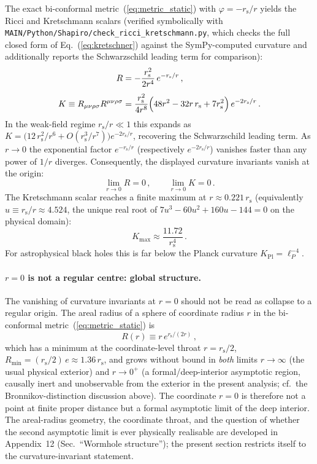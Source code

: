 \documentclass[aps,prd,onecolumn,superscriptaddress,nofootinbib,showpacs,12pt]{revtex4-2}
\newcommand{\rs}{r_{\mathrm{s}}}
\begin{document}
The exact bi-conformal metric~(\ref{eq:metric_static}) with
$\varphi = -\rs/r$ yields the Ricci and Kretschmann scalars
(verified symbolically with
\texttt{MAIN/Python/Shapiro/check\_ricci\_kretschmann.py}, which checks
the full closed form of Eq.~(\ref{eq:kretschner}) against
the SymPy-computed curvature and additionally reports the
Schwarzschild leading term for comparison):
\begin{align}
  R &= -\frac{\rs^{2}}{2r^{4}}\,e^{-\rs/r}\,,
  \label{eq:ricci}\\[4pt]
  K \equiv R_{\mu\nu\rho\sigma}R^{\mu\nu\rho\sigma}
    &= \frac{\rs^{2}}{4r^{8}}\Bigl(48r^{2}-32r\,\rs+7\rs^{2}\Bigr)\,
       e^{-2\rs/r}\,.
  \label{eq:kretschner}
\end{align}
In the weak-field regime $\rs/r\ll 1$ this expands as
$K = \bigl(12\,\rs^{2}/r^{6}+O(\rs^{3}/r^{7})\bigr)e^{-2\rs/r}$,
recovering the Schwarzschild leading term.
As $r \to 0$ the exponential factor $e^{-\rs/r}$ (respectively
$e^{-2\rs/r}$) vanishes faster than any power of $1/r$
diverges.  Consequently, the displayed curvature invariants
vanish at the origin:
\begin{equation}\label{eq:K_limit}
  \lim_{r\to 0} R = 0\,,\qquad
  \lim_{r\to 0} K = 0\,.
\end{equation}
The Kretschmann scalar reaches a finite maximum at
$r \approx 0.221\,\rs$
(equivalently $u\equiv\rs/r\approx 4.524$, the unique real root of
$7u^{3}-60u^{2}+160u-144=0$ on the physical domain):
\begin{equation}\label{eq:K_max}
  K_{\max} \approx \frac{11.72}{\rs^{4}}\,.
\end{equation}
For astrophysical black holes this is far below the
Planck curvature $K_{\mathrm{Pl}} = \ell_{P}^{-4}$.

\paragraph{$r=0$ is not a regular centre: global structure.}
The vanishing of curvature invariants at $r=0$ should not
be read as collapse to a regular origin.  The areal radius
of a sphere of coordinate radius $r$ in the bi-conformal
metric~(\ref{eq:metric_static}) is
\begin{equation}\label{eq:areal}
  R(r) \equiv r\,e^{\rs/(2r)}\,,
\end{equation}
which has a minimum at the coordinate-level throat
$r=\rs/2$, $R_{\min} = (\rs/2)\,e \approx 1.36\,\rs$, and
grows without bound in \emph{both} limits $r\to\infty$ (the
usual physical exterior) and $r\to 0^{+}$ (a formal/deep-interior
asymptotic region, causally inert and unobservable from the
exterior in the present analysis; cf.\ the Bronnikov-distinction
discussion above).  The coordinate $r=0$ is therefore not a
point at finite proper distance but a formal asymptotic limit
of the deep interior.  The areal-radius geometry, the
coordinate throat, and the question of whether the second
asymptotic limit is ever physically realisable are developed
in Appendix~12 (Sec.~``Wormhole structure''); the present
section restricts itself to the curvature-invariant statement.
\end{document}
